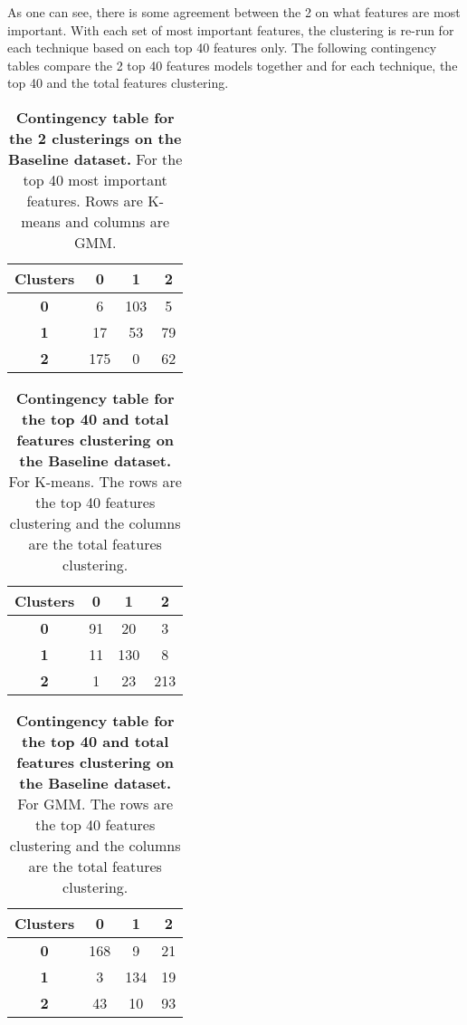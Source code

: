 \documentclass[12pt]{report} %
\begin{document}
As one can see, there is some agreement between the 2 on what features are most important. With each set of most important features, the clustering is re-run for each technique based on each top 40 features only. The following contingency tables compare the 2 top 40 features models together and for each technique, the top 40 and the total features clustering.

\begin{table}[h]
    \centering
    \begin{tabular}{ |c|c|c|c| }
        \hline
        \textbf{Clusters} & \textbf{0} & \textbf{1} & \textbf{2}\\ 
        \hline
        \textbf{0} & 6 & 103 & 5\\
        \hline
        \textbf{1} & 17 & 53 & 79\\
        \hline
        \textbf{2} & 175 & 0 & 62\\
        \hline
    \end{tabular}
    \caption{\textbf{Contingency table for the 2 clusterings on the Baseline dataset.} For the top 40 most important features. Rows are K-means and columns are GMM.}
\end{table}

\begin{table}[h]
    \centering
    \begin{tabular}{ |c|c|c|c| }
        \hline
        \textbf{Clusters} & \textbf{0} & \textbf{1} & \textbf{2}\\ 
        \hline
        \textbf{0} & 91 & 20 & 3\\
        \hline
        \textbf{1} & 11 & 130 & 8\\
        \hline
        \textbf{2} & 1 & 23 & 213\\
        \hline
    \end{tabular}
    \caption{\textbf{Contingency table for the top 40 and total features clustering on the Baseline dataset.} For K-means. The rows are the top 40 features clustering and the columns are the total features clustering.}
\end{table}

\begin{table}[h]
    \centering
    \begin{tabular}{ |c|c|c|c| }
        \hline
        \textbf{Clusters} & \textbf{0} & \textbf{1} & \textbf{2}\\ 
        \hline
        \textbf{0} & 168 & 9 & 21\\
        \hline
        \textbf{1} & 3 & 134 & 19\\
        \hline
        \textbf{2} & 43 & 10 & 93\\
        \hline
    \end{tabular}
    \caption{\textbf{Contingency table for the top 40 and total features clustering on the Baseline dataset.} For GMM. The rows are the top 40 features clustering and the columns are the total features clustering.}
\end{table}
\end{document}
